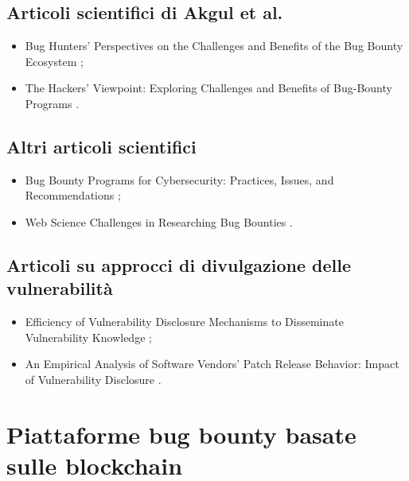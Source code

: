 \subsection*{Articoli scientifici di Akgul et al.}
\begin{itemize}

\item Bug Hunters' Perspectives on the Challenges and Benefits of the Bug Bounty Ecosystem \cite{akgul2023bughunters};

\item The Hackers' Viewpoint: Exploring Challenges and Benefits of Bug-Bounty Programs \cite{akgul2020bughunters}.

\end{itemize}

\subsection*{Altri articoli scientifici}
\begin{itemize}

\item Bug Bounty Programs for Cybersecurity: Practices, Issues, and Recommendations \cite{malladi2020bugbounty};

\item Web Science Challenges in Researching Bug Bounties \cite{fryer2017bugbounty}.

\end{itemize}

\subsection*{Articoli su approcci di divulgazione delle vulnerabilità}
\begin{itemize}

\item Efficiency of Vulnerability Disclosure Mechanisms to Disseminate Vulnerability Knowledge \cite{cavusoglu2007vulndisc};

\item An Empirical Analysis of Software Vendors' Patch Release Behavior: Impact of Vulnerability Disclosure \cite{arora2010vulndisc}.

\end{itemize}

\section*{Piattaforme bug bounty basate sulle blockchain}

